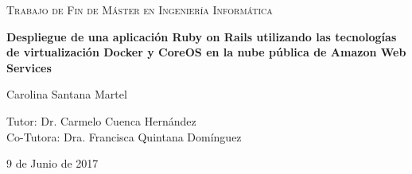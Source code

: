 \begin{titlepage}
	\centering
	\begin{figure}[H]
        \centering
	\end{figure}\par\vspace{1cm}
	{\scshape\Large Trabajo de Fin de Máster en Ingeniería Informática\par}
	\vspace{1.5cm}
	{\huge\bfseries Despliegue de una aplicación Ruby on Rails utilizando las tecnologías de virtualización Docker y CoreOS en la nube pública de Amazon Web Services\par}
	\vspace{2.5cm}
	{\Large Carolina Santana Martel\par}
	\vspace{1.5cm}
	Tutor: Dr. Carmelo Cuenca Hernández \\
        \vspace{0.5cm}
	Co-Tutora: Dra. Francisca Quintana Domínguez \\ 
        \vspace{1.5cm}
	{\large 9 de Junio de 2017\par}
\end{titlepage}
\pagestyle{empty}
